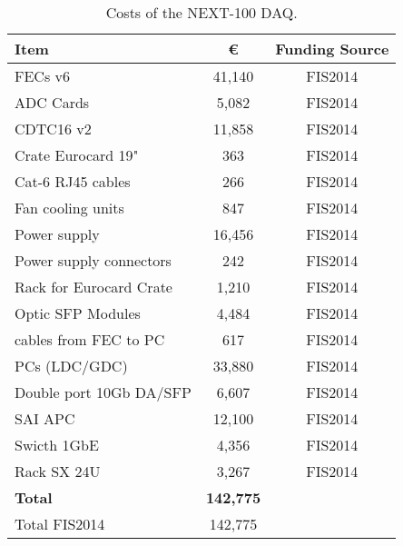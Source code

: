 \begin{table}[h!]
\begin{center}
\begin{tabular}{|l|c|c|}
\hline
 Item & \euro & Funding Source \\
 \hline
FECs v6	&	41,140 & FIS2014 \\
ADC Cards	&	5,082 & FIS2014 \\
CDTC16 v2	&	11,858 & FIS2014 \\
Crate Eurocard 19" 	&	363 & FIS2014 \\
Cat-6 RJ45 cables & 266 & FIS2014 \\
Fan cooling units	&	847 & FIS2014 \\
Power supply & 	16,456 & FIS2014 \\
Power supply connectors &	242 & FIS2014 \\
Rack for Eurocard Crate	&	1,210 & FIS2014 \\
Optic SFP Modules &	4,484 & FIS2014 \\
cables from FEC to PC &	617 & FIS2014 \\
PCs (LDC/GDC)	&	33,880 & FIS2014 \\
Double port 10Gb DA/SFP & 6,607 & FIS2014 \\
SAI	APC	 &	12,100 & FIS2014 \\
Swicth 1GbE	& 4,356 & FIS2014 \\
Rack  SX 24U 	&	3,267 & FIS2014 \\						
  \hline
{\bf Total} &	{\bf 142,775}	& \\
 Total FIS2014	&	142,775& \\
 \hline\hline
\end{tabular}  
\caption{Costs of the NEXT-100 DAQ.}
\label{tab.n100:DAQ}
\end{center}
\end{table} 



